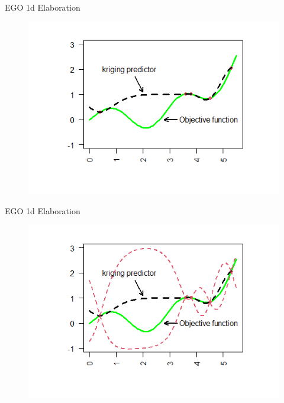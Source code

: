 \documentclass{beamer}
\begin{document}
\begin{frame}{EGO 1d Elaboration}
\begin{figure}
    \centering
    \includegraphics[scale=.7]{images/ego1d/fn3.png}
    \label{fig:f3}
\end{figure}
\end{frame}

\begin{frame}{EGO 1d Elaboration}
\begin{figure}
    \centering
    \includegraphics[scale=.7]{images/ego1d/fn4.png}
    \label{fig:f4}
\end{figure}
\end{frame}
\end{document}
